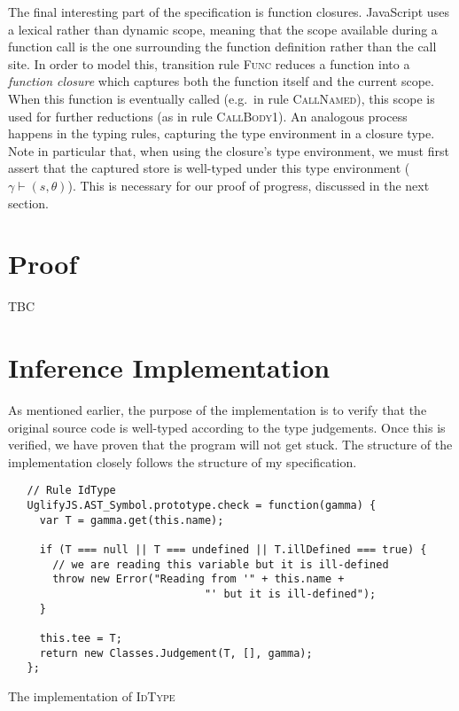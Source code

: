 \documentclass[12pt,a4paper,twoside,openright]{report}
\begin{document}
The final interesting part of the specification is function closures.
JavaScript uses a lexical rather than dynamic scope, meaning that the scope
available during a function call is the one surrounding the function definition
rather than the call site. In order to model this, transition rule
\textsc{Func} reduces a function into a \textit{function closure} which
captures both the function itself and the current scope. When this function is
eventually called (e.g.~in rule \textsc{CallNamed}), this scope is used for
further reductions (as in rule \textsc{CallBody1}). An analogous process
happens in the typing rules, capturing the type environment in a closure type.
Note in particular that, when using the closure's type
environment, we must first assert that the captured store is well-typed under
this type environment ($\gamma \vdash (s, \theta)$). This is necessary for our
proof of progress, discussed in the next section.

\section{Proof}
TBC

\section{Inference Implementation}
As mentioned earlier, the purpose of the implementation is to verify that the
original source code is well-typed according to the type judgements. Once this
is verified, we have proven that the program will not get stuck. The structure
of the implementation closely follows the structure of my specification. 

\begin{program}[t]
  \begin{verbatim}
   // Rule IdType
   UglifyJS.AST_Symbol.prototype.check = function(gamma) {
     var T = gamma.get(this.name);
 
     if (T === null || T === undefined || T.illDefined === true) {
       // we are reading this variable but it is ill-defined
       throw new Error("Reading from '" + this.name +
                               "' but it is ill-defined");
     }

	 this.tee = T;
	 return new Classes.Judgement(T, [], gamma);
   };
  \end{verbatim}
  \caption{The implementation of \textsc{IdType}}\label{lst:idimpl}
\end{program}
\end{document}
